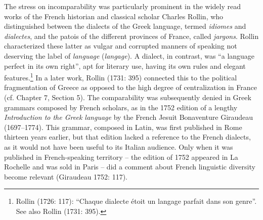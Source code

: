 \documentclass[12pt]{article}
\newenvironment{styleStandard}{\renewcommand\baselinestretch{1.25}\setlength\leftskip{0in}\setlength\rightskip{0in}\setlength\parindent{0.1972in}\setlength\parfillskip{0pt plus 1fil}\setlength\parskip{0in plus 1pt}\writerlistparindent\writerlistleftskip\leavevmode\normalfont\normalsize\writerlistlabel\ignorespaces}{\unskip\vspace{0in plus 1pt}\par}
\newcommand\writerlistleftskip{}
\newcommand\writerlistparindent{}
\newcommand\writerlistlabel{}
\begin{document}
\begin{styleStandard}
The stress on incomparability was particularly prominent in the widely read works of the French historian and classical scholar Charles Rollin, who distinguished between the dialects of the Greek language, termed \textit{idiomes} and \textit{dialectes}, and the patois of the different provinces of France, called \textit{jargons}. Rollin characterized these latter as vulgar and corrupted manners of speaking not deserving the label of \textit{language} (\textit{langage}). A dialect, in contrast, was “a language perfect in its own right”, apt for literary use, having its own rules and elegant features.\footnote{ Rollin (1726: 117): “Chaque dialecte étoit un langage parfait dans son genre”. See also Rollin (1731: 395).} In a later work, Rollin (1731: 395) connected this to the political fragmentation of Greece as opposed to the high degree of centralization in France (cf. Chapter 7, Section 5). The comparability was subsequently denied in Greek grammars composed by French scholars, as in the 1752 edition of a lengthy \textit{Introduction to the Greek language} by the French Jesuit Bonaventure Giraudeau (1697–1774). This grammar, composed in Latin, was first published in Rome thirteen years earlier, but that edition lacked a reference to the French dialects, as it would not have been useful to its Italian audience. Only when it was published in French-speaking territory – the edition of 1752 appeared in La Rochelle and was sold in Paris – did a comment about French linguistic diversity become relevant (Giraudeau 1752: 117).
\end{styleStandard}
\end{document}

